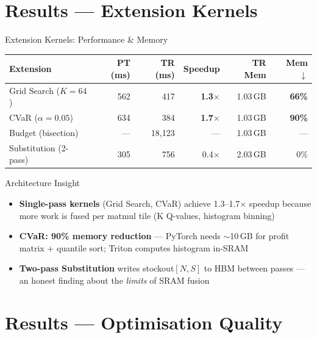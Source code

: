 \documentclass[aspectratio=169, 11pt]{beamer}
\begin{document}
\section{Results --- Extension Kernels}

\begin{frame}{Extension Kernels: Performance \& Memory}
\begin{center}
\small
\begin{tabular}{lrrrrr}
\toprule
\textbf{Extension} & \textbf{PT (ms)} & \textbf{TR (ms)} & \textbf{Speedup} & \textbf{TR Mem} & \textbf{Mem $\downarrow$} \\
\midrule
Grid Search ($K{=}64$)   & 562 & 417 & \textcolor{goodgreen}{\textbf{1.3$\times$}} & 1.03\,GB & \textcolor{goodgreen}{\textbf{66\%}} \\
CVaR ($\alpha{=}0.05$)   & 634 & 384 & \textcolor{goodgreen}{\textbf{1.7$\times$}} & 1.03\,GB & \textcolor{goodgreen}{\textbf{90\%}} \\
Budget (bisection)       & ---   & 18{,}123 & ---         & 1.03\,GB & --- \\
Substitution (2-pass)    & 305 & 756 & 0.4$\times$ & 2.03\,GB & 0\% \\
\bottomrule
\end{tabular}
\end{center}

\vspace{0.5em}
\begin{block}{Architecture Insight}
\begin{itemize}
    \item \textbf{Single-pass kernels} (Grid Search, CVaR) achieve 1.3--1.7$\times$ speedup because more work is fused per matmul tile (K Q-values, histogram binning)
    \item \textbf{CVaR: 90\% memory reduction} --- PyTorch needs ${\sim}$10\,GB for profit matrix + quantile sort; Triton computes histogram in-SRAM
    \item \textbf{Two-pass Substitution} writes stockout$[N,S]$ to HBM between passes --- an honest finding about the \textit{limits} of SRAM fusion
\end{itemize}
\end{block}
\end{frame}

\section{Results --- Optimisation Quality}
\end{document}
